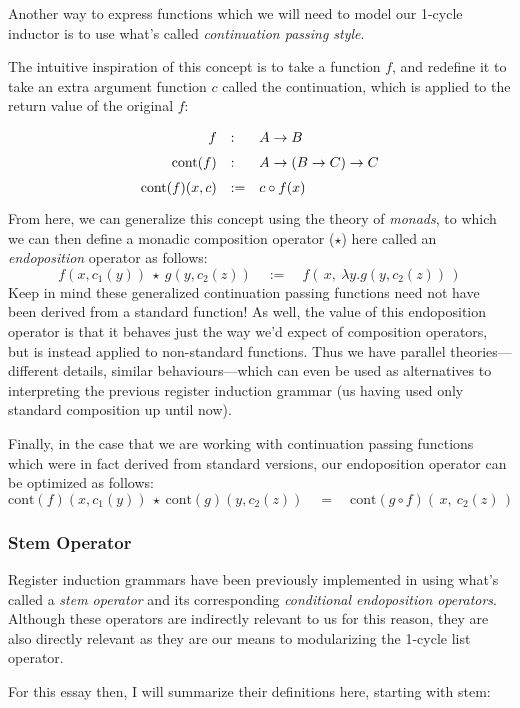 \documentclass[twoside]{article}
\newcommand{\qeq}{\ensuremath{\quad =\quad}}
\newcommand{\qdefeq}{\ensuremath{\quad :=\quad}}
\newcommand{\cont}{\mbox{cont}}
\begin{document}
Another way to express functions which we will need to model our 1-cycle inductor is to use what's called
\emph{continuation passing style}.

The intuitive inspiration of this concept is to take a function $ f $, and redefine it to take an extra
argument function $ c $ called the continuation, which is applied to the return value of the original $ f $:
$$ \def\arraystretch{1.5}
\begin{array}{rll}
f			& :  & A \to B				\\
\cont(f)		& :  & A \to (B \to C) \to C		\\
\cont(f)(x,c)		& := & c \circ f(x)
\end{array} $$
From here, we can generalize this concept using the theory of \emph{monads}, to which we can then define a monadic
composition operator ($ \star $) here called an \emph{endoposition} operator as follows:
$$ f(x, c_1(y))\ \star\ g(y, c_2(z)) \qdefeq f(\,x,\ \lambda y.g(y, c_2(z))\,) $$
Keep in mind these generalized continuation passing functions need not have been derived from a standard function!
As well, the value of this endoposition operator is that it behaves just the way we'd expect of composition operators,
but is instead applied to non-standard functions. Thus we have parallel theories---different details, similar
behaviours---which can even be used as alternatives to interpreting the previous register induction grammar
(us having used only standard composition up until now).

Finally, in the case that we are working with continuation passing functions which were in fact derived from
standard versions, our endoposition operator can be optimized as follows:
$$ \cont(f)(x, c_1(y))\ \star\ \cont(g)(y, c_2(z)) \qeq \cont(g \circ f)(\,x,\ c_2(z)\,) $$

\subsubsection*{Stem Operator}

Register induction grammars have been previously implemented in \cite{nikfi} using what's called a \emph{stem operator}
and its corresponding \emph{conditional endoposition operators}. Although these operators are indirectly relevant to
us for this reason, they are also directly relevant as they are our means to modularizing the 1-cycle list operator.

For this essay then, I will summarize their definitions here, starting with stem:
\end{document}
